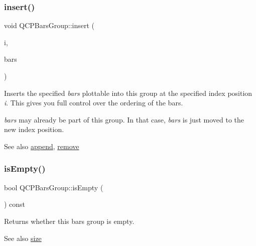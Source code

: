 \subsubsection{\texorpdfstring{insert()}{insert()}}
{\footnotesize\ttfamily void Q\+C\+P\+Bars\+Group\+::insert (\begin{DoxyParamCaption}\item[{int}]{i,  }\item[{\hyperlink{class_q_c_p_bars}{Q\+C\+P\+Bars} $\ast$}]{bars }\end{DoxyParamCaption})}

Inserts the specified {\itshape bars} plottable into this group at the specified index position {\itshape i}. This gives you full control over the ordering of the bars.

{\itshape bars} may already be part of this group. In that case, {\itshape bars} is just moved to the new index position.

\begin{DoxySeeAlso}{See also}
\hyperlink{class_q_c_p_bars_group_a809ed63cc4ff7cd5b0b8c96b470163d3}{append}, \hyperlink{class_q_c_p_bars_group_a215e28a5944f1159013a0e19169220e7}{remove} 
\end{DoxySeeAlso}
\mbox{\label{class_q_c_p_bars_group_aac959e79e852e8ef9aea6e0449ad000a}} 
\subsubsection{\texorpdfstring{is\+Empty()}{isEmpty()}}
{\footnotesize\ttfamily bool Q\+C\+P\+Bars\+Group\+::is\+Empty (\begin{DoxyParamCaption}{ }\end{DoxyParamCaption}) const\hspace{0.3cm}{\ttfamily [inline]}}

Returns whether this bars group is empty.

\begin{DoxySeeAlso}{See also}
\hyperlink{class_q_c_p_bars_group_a3780ec77919cb00840207ec7a0f00dd5}{size} 
\end{DoxySeeAlso}
\mbox{\label{class_q_c_p_bars_group_a215e28a5944f1159013a0e19169220e7}} 
